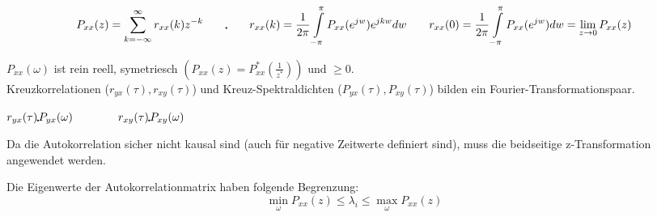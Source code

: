         $$P_{xx}(z) = \sum\limits_{k=-\infty}^{\infty} r_{xx}(k)z^{-k}\qquad \IFT \qquad 
       	r_{xx}(k)=\frac 1{2\pi} \int \limits_{-\pi}^{\pi} P_{xx}(e^{jw})e^{jkw}dw \qquad 
       	r_{xx}(0) =\frac 1{2\pi} \int \limits_{-\pi}^{\pi} P_{xx}(e^{jw})dw = \lim\limits_{z \rightarrow 0} P_{xx}(z)$$
                             
$P_{xx}(\omega)$ ist rein reell, symetriesch $(P_{xx}(z)=P_{xx}^*(\frac{1}{z^*}))$ und $\geq 0$. \\
Kreuzkorrelationen ($r_{yx}(\tau), r_{xy}(\tau)$) und Kreuz-Spektraldichten ($P_{yx}(\tau),
P_{xy}(\tau)$) bilden ein Fourier-Transformationspaar.
\begin{center}
$ r_{yx}(\tau) \FT P_{yx}(\omega) \qquad \qquad r_{xy}(\tau) \FT P_{xy}(\omega)  $
\end{center}
Da die Autokorrelation sicher nicht kausal sind (auch für negative Zeitwerte definiert sind), muss die beidseitige z-Transformation angewendet werden.

Die Eigenwerte der Autokorrelationmatrix haben folgende Begrenzung:\\
$$\min\limits_\omega P_{xx}(z)\leq \lambda_i \leq \max\limits_{\omega}P_{xx}(z)$$

